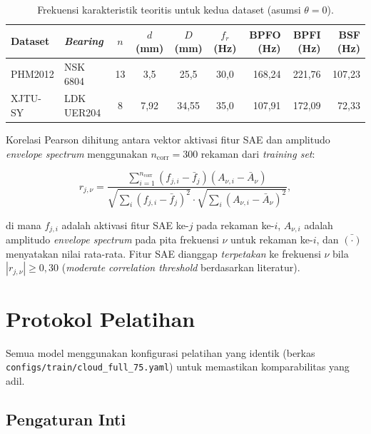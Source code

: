\begin{table}[ht]
\centering
\caption{Frekuensi karakteristik teoritis untuk kedua dataset
(asumsi $\theta = 0$\textdegree).}
\label{tab:bab4_bpfx}
\footnotesize
\setlength{\tabcolsep}{4pt}
\begin{tabular}{@{}l l c c c c r r r@{}}
\toprule
\textbf{Dataset} & \textbf{\emph{Bearing}} & $n$ & $d$ (mm) & $D$ (mm) & $f_r$ (Hz)
  & \textbf{BPFO (Hz)} & \textbf{BPFI (Hz)} & \textbf{BSF (Hz)} \\
\midrule
PHM2012  & NSK 6804   & 13 & 3{,}5  & 25{,}5  & 30{,}0 & 168{,}24 & 221{,}76 & 107{,}23 \\
XJTU-SY  & LDK UER204 &  8 & 7{,}92 & 34{,}55 & 35{,}0 & 107{,}91 & 172{,}09 &  72{,}33 \\
\bottomrule
\end{tabular}
\end{table}

Korelasi Pearson dihitung antara vektor aktivasi fitur SAE dan amplitudo
\emph{envelope spectrum} menggunakan $n_{\text{corr}} = 300$ rekaman
dari \emph{training set}:

\begin{equation}\label{eq:bab4_pearson}
r_{j,\nu} = \frac{\sum_{i=1}^{n_{\text{corr}}} (f_{j,i} - \bar{f}_j)(A_{\nu,i} - \bar{A}_\nu)}
{\sqrt{\sum_{i}(f_{j,i}-\bar{f}_j)^2} \cdot \sqrt{\sum_{i}(A_{\nu,i}-\bar{A}_\nu)^2}},
\end{equation}

\noindent di mana $f_{j,i}$ adalah aktivasi fitur SAE ke-$j$ pada
rekaman ke-$i$, $A_{\nu,i}$ adalah amplitudo \emph{envelope spectrum}
pada pita frekuensi $\nu$ untuk rekaman ke-$i$, dan $\bar{(\cdot)}$
menyatakan nilai rata-rata.
Fitur SAE dianggap \emph{terpetakan} ke frekuensi $\nu$ bila
$|r_{j,\nu}| \geq 0{,}30$ (\emph{moderate correlation threshold}
berdasarkan literatur).

\section{Protokol Pelatihan}
\label{sec:bab4_training}

Semua model menggunakan konfigurasi pelatihan yang identik
(berkas \texttt{configs/\allowbreak train/\allowbreak cloud\_full\_75.yaml})
untuk memastikan komparabilitas yang adil.

\subsection{Pengaturan Inti}
\label{subsec:bab4_hyperp_training}

